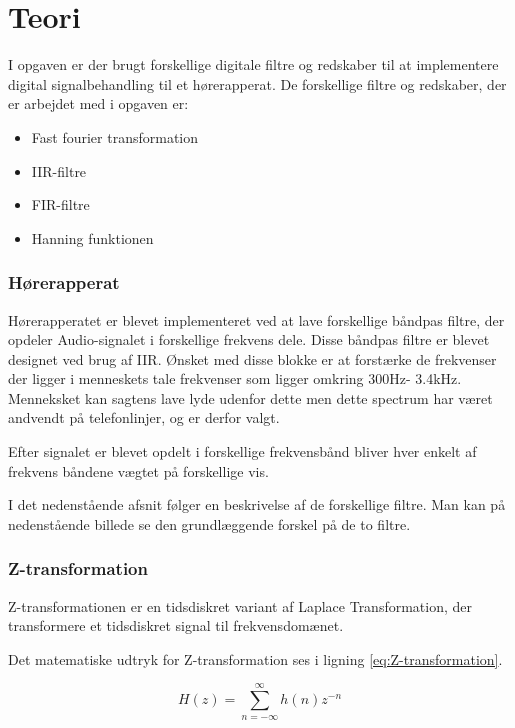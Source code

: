 \chapter{Teori}\label{ch:Teori}

I opgaven er der brugt forskellige digitale filtre og redskaber til at implementere digital signalbehandling til et hørerapperat. De forskellige filtre og redskaber, der er arbejdet med i opgaven er:
\begin{itemize}
\item Fast fourier transformation
\item IIR-filtre
\item FIR-filtre
\item Hanning funktionen
\end{itemize}

\subsection{Hørerapperat}
Hørerapperatet er blevet implementeret ved at lave forskellige båndpas filtre, der opdeler Audio-signalet i forskellige frekvens dele. Disse båndpas filtre er blevet designet ved brug af IIR. Ønsket med disse blokke er at forstærke de frekvenser der ligger i menneskets tale frekvenser som ligger omkring 300Hz- 3.4kHz. Menneksket kan sagtens lave lyde udenfor dette men dette spectrum har været andvendt på telefonlinjer, og er derfor valgt. 


Efter signalet er blevet opdelt i forskellige frekvensbånd bliver hver enkelt af frekvens båndene vægtet på forskellige vis.

I det nedenstående afsnit følger en beskrivelse af de forskellige filtre. Man kan på nedenstående billede  se den grundlæggende forskel på de to filtre.


\subsection{Z-transformation}
Z-transformationen er en tidsdiskret variant af Laplace Transformation, der transformere et tidsdiskret signal til frekvensdomænet.

Det matematiske udtryk for Z-transformation ses i ligning \ref{eq:Z-transformation}.

\begin{equation}\label{eq:Z-transformation}
{H(z)} = \displaystyle\sum_{n=-\infty }^{\infty} {h(n)z^{-n}}
\end{equation}
 

